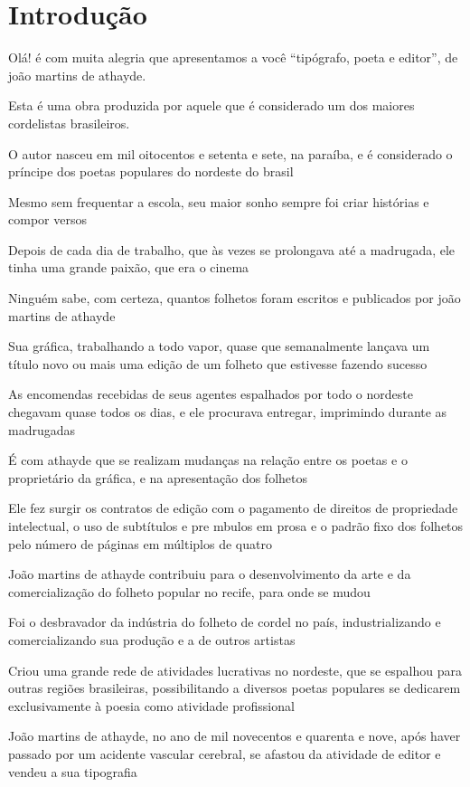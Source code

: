 \documentclass[12pt]{extarticle}
\begin{document}
\tableofcontents

\section{Introdução}

Olá! é com muita alegria que apresentamos a você “tipógrafo, poeta e editor”, de joão martins de athayde.

Esta é uma obra produzida por aquele que é considerado um dos maiores cordelistas brasileiros.

O autor nasceu em mil oitocentos e setenta e sete, na paraíba,  e é considerado  o príncipe dos poetas populares do nordeste do brasil  

Mesmo sem frequentar a escola,  seu maior sonho sempre foi criar histórias e compor versos

Depois de cada dia de trabalho, que às vezes se prolongava até a madrugada, ele tinha uma grande paixão, que era o cinema 

Ninguém sabe, com certeza, quantos folhetos foram escritos e publicados por joão martins de athayde

Sua gráfica, trabalhando a todo vapor, quase que semanalmente lançava um título novo ou mais uma edição de um folheto que estivesse fazendo sucesso

As encomendas recebidas de seus agentes espalhados por todo o nordeste chegavam quase todos os dias, e ele procurava entregar, imprimindo durante as madrugadas

É com athayde que se realizam mudanças na relação entre os poetas e o proprietário da gráfica, e na apresentação dos folhetos

Ele fez surgir os contratos de edição com o pagamento de direitos de propriedade intelectual, o uso de subtítulos e pre mbulos em prosa e o padrão fixo dos folhetos pelo número de páginas em múltiplos de quatro

João martins de athayde contribuiu para o desenvolvimento da arte e da comercialização do folheto popular no recife, para onde se mudou

Foi o desbravador da indústria do folheto de cordel no país, industrializando e comercializando sua produção e a de outros artistas

Criou uma grande rede de atividades lucrativas no nordeste, que se espalhou para outras regiões brasileiras, possibilitando a diversos poetas populares se dedicarem exclusivamente à poesia como atividade profissional

João martins de athayde, no ano de mil novecentos e quarenta e nove, após haver passado por um acidente vascular cerebral, se afastou da atividade de editor e vendeu a sua tipografia 
\end{document}
